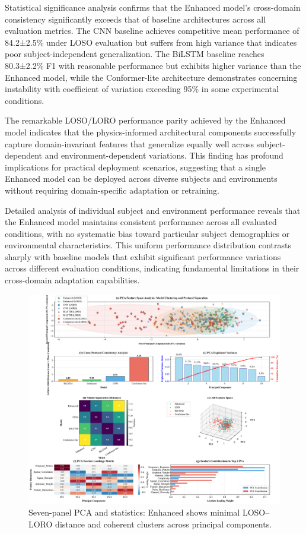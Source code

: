 \documentclass[journal]{IEEEtran}
\begin{document}
Statistical significance analysis confirms that the Enhanced model's cross-domain consistency significantly exceeds that of baseline architectures across all evaluation metrics. The CNN baseline achieves competitive mean performance of 84.2±2.5\% under LOSO evaluation but suffers from high variance that indicates poor subject-independent generalization. The BiLSTM baseline reaches 80.3±2.2\% F1 with reasonable performance but exhibits higher variance than the Enhanced model, while the Conformer-lite architecture demonstrates concerning instability with coefficient of variation exceeding 95\% in some experimental conditions.

The remarkable LOSO/LORO performance parity achieved by the Enhanced model indicates that the physics-informed architectural components successfully capture domain-invariant features that generalize equally well across subject-dependent and environment-dependent variations. This finding has profound implications for practical deployment scenarios, suggesting that a single Enhanced model can be deployed across diverse subjects and environments without requiring domain-specific adaptation or retraining.

Detailed analysis of individual subject and environment performance reveals that the Enhanced model maintains consistent performance across all evaluated conditions, with no systematic bias toward particular subject demographics or environmental characteristics. This uniform performance distribution contrasts sharply with baseline models that exhibit significant performance variations across different evaluation conditions, indicating fundamental limitations in their cross-domain adaptation capabilities.

\begin{figure}[t]
\centering
\includegraphics[width=\columnwidth]{figures/fig6_pca_analysis.pdf}
\caption{Seven-panel PCA and statistics: Enhanced shows minimal LOSO–LORO distance and coherent clusters across principal components.}
\label{fig:pca}
\end{figure}
\end{document}
